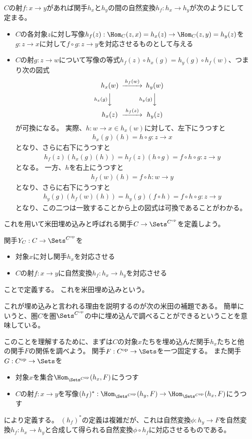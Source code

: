 \documentclass[uplatex]{jsarticle}
\begin{document}
$C$の射$f:x \to y$があれば関手$h_x$と$h_y$の間の自然変換$h_f:h_x\to h_y$が次のようにして定まる。
\begin{itemize}
\item $C$の各対象$z$に対し写像$h_f(z):\Hom_C(z,x)=h_x(z)\to \Hom_C(z,y)=h_y(z)$を$g:z \to x$に対して$f\circ g:z \to y$を対応させるものとして与える
\item $C$の射$g:z\to w$について写像の等式$h_f(z)\circ h_x(g)=h_y(g)\circ h_f(w)$、つまり次の図式
\[
\begin{CD}
h_x(w)@>h_f(w)>>h_y(w)\\
@Vh_x(g)VV@Vh_y(g)VV\\
h_x(z)@>h_f(z)>>h_y(z)
\end{CD}
\]
が可換になる。
実際、$h:w\to x \in h_x(w)$に対して、左下にうつすと
\begin{align*}
h_x(g)(h)=h\circ g:z \to x
\end{align*}
となり、さらに右下にうつすと
\begin{align*}
h_f(z)(h_x(g)(h))=h_f(z)(h\circ g)=f\circ h \circ g:z \to y
\end{align*}
となる。
一方、$h$を右上にうつすと
\begin{align*}
h_f(w)(h)=f\circ h:w \to y
\end{align*}
となり、さらに右下にうつすと
\begin{align*}
h_y(g)(h_f(w)(h))=h_y(g)(f\circ h)=f\circ h \circ g:z \to y
\end{align*}
となり、この二つは一致することから上の図式は可換であることがわかる。
\end{itemize}

これを用いて米田埋め込みと呼ばれる関手$C\to \Sets^{C^{\rm op}}$を定義しよう。
\begin{dfn}[米田埋め込み]
関手$Y_C:C\to \Sets^{C^{\rm op}}$を
\begin{itemize}
\item 対象$x$に対し関手$h_x$を対応させる
\item $C$の射$f:x\to y$に自然変換$h_f:h_x\to h_y$を対応させる
\end{itemize}
ことで定義する。
これを米田埋め込みという。
\end{dfn}

\vspace{5pt}

これが埋め込みと言われる理由を説明するのが次の米田の補題である。
簡単にいうと、圏$C$を圏$\Sets^{C^{\rm op}}$の中に埋め込んで調べることができるということを意味している。

このことを理解するために、まずは$C$の対象$x$たちを埋め込んだ関手$h_x$たちと他の関手$F$の関係を調べよう。
関手$F:C^{\rm op} \to \Sets$を一つ固定する。
また関手$G:C^{\rm op} \to \Sets$を
\begin{itemize}
\item 対象$x$を集合$\Hom_{\Sets^{C^{\rm op}}}(h_x,F)$にうつす
\item $C$の射$f:x\to y$を写像$(h_f)^*:\Hom_{\Sets^{C^{\rm op}}}(h_y,F)\to \Hom_{\Sets^{C^{\rm op}}}(h_x,F)$にうつす
\end{itemize}
により定義する。
$(h_f)^*$の定義は複雑だが、これは自然変換$\phi:h_y \to F$を自然変換$h_f:h_x \to h_y$と合成して得られる自然変換$\phi\circ h_f$に対応させるものである。
\end{document}
